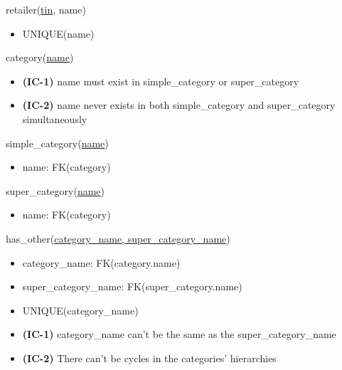 \documentclass[12pt,a4paper]{article}
\begin{document}
  \noindent
  retailer(\underline{tin}, name)
  \begin{itemize}[nosep]
    \item UNIQUE(name)
  \end{itemize}
  
  \vspace*{10pt}
  
  \noindent
  category(\underline{name})
  \begin{itemize}[nosep]
    \item \textsf{\textbf{(IC-1)}} name \textsf{must exist in} simple\_category \textsf{or} super\_category
    \item \textsf{\textbf{(IC-2)}} name \textsf{never exists in both} simple\_category \textsf{and} super\_category \textsf{simultaneously}
  \end{itemize}
  
  \vspace*{10pt}
  
  \noindent
  simple\_category(\underline{name})
  \begin{itemize}[nosep]
    \item name: FK(category)
  \end{itemize}
  
  \vspace*{10pt}
  
  \noindent
  super\_category(\underline{name})
  \begin{itemize}[nosep]
    \item name: FK(category)
  \end{itemize}
  
  \vspace*{10pt}
  
  \noindent
  has\_other(\underline{category\_name, super\_category\_name})
  \begin{itemize}[nosep]
    \item category\_name: FK(category.name)
    \item super\_category\_name: FK(super\_category.name)
    \item UNIQUE(category\_name)
    \item \textsf{\textbf{(IC-1)}} category\_name \textsf{can't be the same as the} super\_category\_name
    \item \textsf{\textbf{(IC-2)} There can't be cycles in the categories' hierarchies}
  \end{itemize}
  
  \vspace*{10pt}
  
\end{document}
